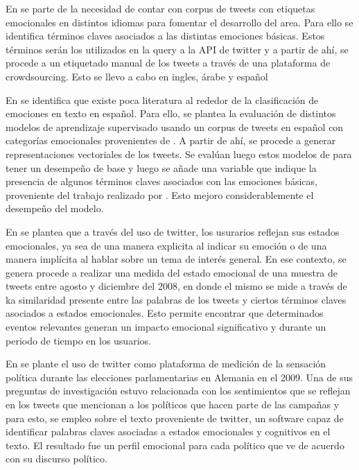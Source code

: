 En \cite{mohammad2018semeval} se parte de la necesidad de contar con corpus de tweets con etiquetas emocionales en distintos idiomas para fomentar el desarrollo del area. Para ello se identifica términos claves asociados a las distintas emociones básicas. Estos términos serán los utilizados en la query a la API de twitter y a partir de ahí, se procede a un etiquetado manual de los tweets a través de una plataforma de crowdsourcing. Esto se llevo a cabo en ingles, árabe y español


En \cite{plaza2020improved} se identifica que existe poca literatura al rededor de la clasificación de emociones en texto en español. Para ello, se plantea la evaluación de distintos modelos de aprendizaje supervisado usando un corpus de tweets en español con categorías emocionales provenientes de \cite{mohammad2018semeval}. A partir de ahí, se  procede a generar  representaciones vectoriales de los tweets. Se evalúan luego estos modelos de para tener un desempeño de base y luego se añade una variable que indique la presencia de algunos términos claves asociados con las emociones básicas, proveniente del trabajo realizado por \cite{sidorov2012empirical}. Esto mejoro considerablemente el desempeño del modelo.





En \cite{bollen2011modeling} se plantea que a través del uso de twitter, los usurarios reflejan sus estados emocionales, ya sea de una manera explicita al indicar su emoción o de una manera implícita al hablar sobre un tema de interés general. En ese contexto, se genera procede a realizar una medida del estado emocional de una muestra de tweets entre agosto y diciembre del 2008, en donde el mismo se mide a través de ka similaridad presente entre las palabras de los tweets y ciertos términos claves asociados a estados emocionales. Esto permite encontrar que determinados eventos relevantes generan un impacto emocional significativo y durante un periodo de tiempo en los usuarios.

En \cite{tumasjan2010predicting} se plante el uso de twitter como plataforma de medición de la sensación política durante las elecciones parlamentarias en Alemania en el 2009. Una de sus preguntas de investigación estuvo relacionada con los sentimientos que se reflejan en los tweets que mencionan a los políticos que hacen parte de las campañas y para esto, se empleo sobre el texto proveniente de twitter, un software capaz de identificar palabras claves asociadas a estados emocionales y cognitivos en el texto. El resultado fue un perfil emocional para cada político que ve de acuerdo con su discurso político.

